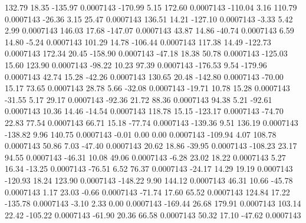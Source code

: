       132.79       18.35     -135.97     0.0007143
     -170.99        5.15      172.60     0.0007143
     -110.04        3.16      110.79     0.0007143
      -26.36        3.15       25.47     0.0007143
      136.51       14.21     -127.10     0.0007143
       -3.33        5.42        2.99     0.0007143
      146.03       17.68     -147.07     0.0007143
       43.87       14.86      -40.74     0.0007143
        6.59       14.80       -5.24     0.0007143
      101.29       14.78     -106.44     0.0007143
      117.38       14.49     -122.73     0.0007143
      172.34       20.45     -158.90     0.0007143
      -47.18       18.38       50.78     0.0007143
     -125.03       15.60      123.90     0.0007143
      -98.22       10.23       97.39     0.0007143
     -176.53        9.54     -179.96     0.0007143
       42.74       15.28      -42.26     0.0007143
      130.65       20.48     -142.80     0.0007143
      -70.00       15.17       73.65     0.0007143
       28.78        5.66      -32.08     0.0007143
      -19.71       10.78       15.28     0.0007143
      -31.55        5.17       29.17     0.0007143
      -92.36       21.72       88.36     0.0007143
       94.38        5.21      -92.61     0.0007143
       10.36       14.46      -14.54     0.0007143
      118.78       15.15     -123.17     0.0007143
      -74.70       22.83       77.54     0.0007143
       66.71       15.18      -77.74     0.0007143
     -139.36        9.51      136.19     0.0007143
     -138.82        9.96      140.75     0.0007143
       -0.01        0.00        0.00     0.0007143
     -109.94        4.07      108.78     0.0007143
       50.86        7.03      -47.40     0.0007143
       20.62       18.86      -39.95     0.0007143
     -108.23       23.17       94.55     0.0007143
      -46.31       10.08       49.06     0.0007143
       -6.28       23.02       18.22     0.0007143
        5.27       16.34      -13.25     0.0007143
      -76.51        6.52       76.37     0.0007143
      -24.17       14.29       19.19     0.0007143
     -120.93       18.24      123.90     0.0007143
     -148.22        9.90      144.12     0.0007143
       46.31       10.66      -45.78     0.0007143
        1.17       23.03       -0.66     0.0007143
      -71.74       17.60       65.52     0.0007143
      124.84       17.22     -135.78     0.0007143
       -3.10        2.33        0.00     0.0007143
     -169.44       26.68      179.91     0.0007143
      103.14       22.42     -105.22     0.0007143
      -61.90       20.36       66.58     0.0007143
       50.32       17.10      -47.62     0.0007143

